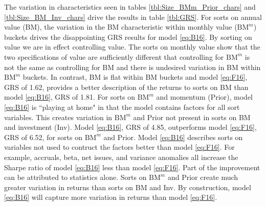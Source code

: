 The variation in characteristics seen in tables \ref{tbl:Size_BMm_Prior_chars}
and \ref{tbl:Size_BM_Inv_chars} drive the results in table \ref{tbl:GRS}.
For sorts on annual value (BM), the variation in the BM characteristic within
monthly value ($\text{BM}^m$) buckets drives the disappointing GRS results for
model \ref{eq:B16}.
By sorting on value we are in effect controlling value.
The sorts on monthly value show that the two specifications of value are
sufficiently different that controlling for $\text{BM}^m$ is not the same as
controlling for BM and there is undesired variation in BM within $\text{BM}^m$
buckets.
In contrast, BM is flat within BM buckets and model \ref{eq:F16}, GRS of 1.62,
provides a better description of the returns to sorts on BM than model
\ref{eq:B16}, GRS of 1.81.
For sorts on $\text{BM}^m$ and momentum (Prior), model \ref{eq:B16} is
``playing at home" in that the model contains factors for all sort variables.
This creates variation in $\text{BM}^m$ and Prior not present in sorts on BM
and investment (Inv). Model \ref{eq:B16}, GRS of 4.85, outperforms model
\ref{eq:F16}, GRS of 6.52, for sorts on $\text{BM}^m$ and Prior.
Model \ref{eq:B16} describes sorts on
variables not used to contruct the factors better than model \ref{eq:F16}.
For example, accruals, beta, net issues, and variance anomalies all
increase the Sharpe ratio of model \ref{eq:B16} less than model \ref{eq:F16}.
Part of the improvement can be attributed to statistics alone.
Sorts on $\text{BM}^m$ and Prior create much greater variation in returns than
sorts on BM and Inv.
By construction, model \ref{eq:B16} will capture more variation in returns than
model \ref{eq:F16}.


